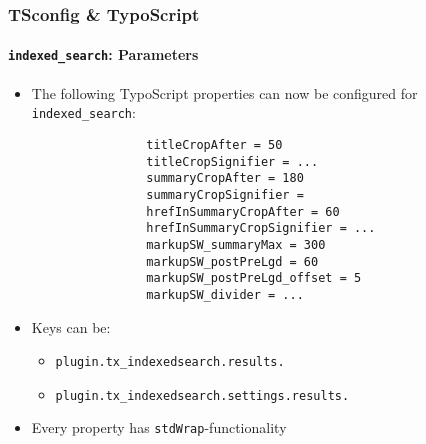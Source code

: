 \begin{frame}[fragile]
	\frametitle{TSconfig \& TypoScript}
	\framesubtitle{\texttt{indexed\_search}: Parameters}

	\lstset{basicstyle=\tiny\ttfamily}

	\begin{itemize}
		\item The following TypoScript properties can now be configured for \texttt{indexed\_search}:

			\begin{lstlisting}
				titleCropAfter = 50
				titleCropSignifier = ...
				summaryCropAfter = 180
				summaryCropSignifier =
				hrefInSummaryCropAfter = 60
				hrefInSummaryCropSignifier = ...
				markupSW_summaryMax = 300
				markupSW_postPreLgd = 60
				markupSW_postPreLgd_offset = 5
				markupSW_divider = ...
			\end{lstlisting}

		\item Keys can be:
			\begin{itemize}
				\item \texttt{plugin.tx\_indexedsearch.results.}
				\item \texttt{plugin.tx\_indexedsearch.settings.results.}
			\end{itemize}

		\item Every property has \texttt{stdWrap}-functionality

	\end{itemize}

\end{frame}

